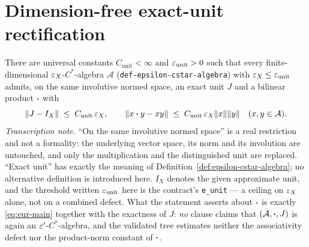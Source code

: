 \section{Dimension-free exact-unit rectification}\label{sec:stage1-exact-unit}

\begin{lemma}\label{lem:stage1-exact-unit-rectification}
There are universal constants $C_{\mathrm{unit}}<\infty$ and $\varepsilon_{\mathrm{unit}}>0$ such
that every finite-dimensional $\varepsilon_X$-$C^*$-algebra $\mathcal A$
(\texttt{def-epsilon-cstar-algebra}) with $\varepsilon_X\le \varepsilon_{\mathrm{unit}}$ admits, on the
same involutive normed space, an exact unit $J$ and a bilinear product $\mathbin{\bm{\cdot}}$ with
\begin{equation}\label{eq:eur-main}
  \lVert J-I_X\rVert\;\le\;C_{\mathrm{unit}}\,\varepsilon_X,
  \qquad
  \lVert x\mathbin{\bm{\cdot}} y-xy\rVert\;\le\;C_{\mathrm{unit}}\,\varepsilon_X\lVert x\rVert\lVert y\rVert
  \quad(x,y\in\mathcal A).
\end{equation}
\emph{Transcription note.} ``On the same involutive normed space'' is a real restriction and
not a formality: the underlying vector space, its norm and its involution are untouched, and
only the multiplication and the distinguished unit are replaced. ``Exact unit'' has exactly the
meaning of Definition~\ref{def:epsilon-cstar-algebra}; no alternative definition is
introduced here. $I_X$ denotes
the given approximate unit, and the threshold written $\varepsilon_{\mathrm{unit}}$ here is the
contract's \texttt{e\_unit} --- a ceiling on $\varepsilon_X$ alone, not on a combined defect. What
the statement asserts about $\mathbin{\bm{\cdot}}$ is exactly
\eqref{eq:eur-main} together with the exactness of $J$: \emph{no} clause claims that
$(\mathcal A,\mathbin{\bm{\cdot}},J)$ is again an $\varepsilon'$-$C^*$-algebra, and the validated tree estimates
neither the associativity defect nor the product-norm constant of $\mathbin{\bm{\cdot}}$.
\end{lemma}

